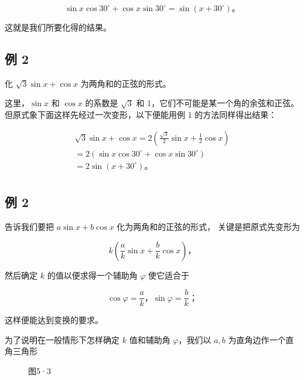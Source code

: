 \[
\sin x \cos 30 ^{\circ} + \cos x \sin 30 ^{\circ} = \sin (x + 30 ^{\circ})\text{。}
\]

这就是我们所要化得的结果。

\subsection{例 2}

化 \(\sqrt{3}\sin x + \cos x\) 为两角和的正弦的形式。

 这里，\(\sin x\) 和 \(\cos x\) 的系数是 \(\sqrt{3}\) 和
1，它们不可能是某一个角的余弦和正弦。但原式象下面这样先经过一次变形，以下便能用例
1 的方法同样得出结果：

\[
\begin{array}{l} \sqrt {3} \sin x + \cos x = 2 \left(\frac {\sqrt {3}}{2} \sin x + \frac {1}{2} \cos x\right) \\ = 2 \left(\sin x \cos 30 ^{\circ} + \cos x \sin 30 ^{\circ}\right) \\ = 2 \sin (x + 30 ^{\circ})\text{。} \\ \end{array}
\]

\subsection{例 2}

告诉我们要把 \(a \sin x + b \cos x\) 化为两角和的正弦的形式，
关键是把原式先变形为

\[
k \left(\frac {a}{k} \sin x + \frac {b}{k} \cos x\right)\text{，} \tag {1}
\]

然后确定 \(k\) 的值以便求得一个辅助角 \(\varphi\) 使它适合于

\[
\cos \varphi = \frac {a}{k}\text{，} \sin \varphi = \frac {b}{k}\text{；}
\]

这样便能达到变换的要求。

为了说明在一般情形下怎样确定 \(k\) 值和辅助角 \(\varphi\)，我们以
\(a, b\) 为直角边作一个直角三角形

\begin{figure}
\centering
{}
\caption{图5·3}
\end{figure}


